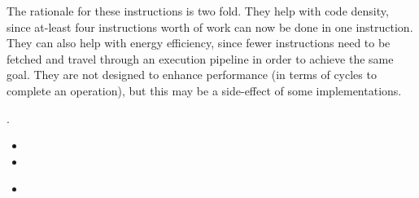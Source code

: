 {The rationale for these instructions is two fold. They help with code density,
since at-least four instructions worth of work can now be done
in one instruction. They can also help with energy efficiency, since fewer
instructions need to be fetched and travel through an execution pipeline in
order to achieve the same goal. They are not designed to enhance performance
(in terms of cycles to complete an operation), but this may be a side-effect
of some implementations.
}
{.\\
\begin{minipage}{0.5\textwidth}
\medskip
\begin{itemize}
\item {}
\item {}
\end{itemize}
\end{minipage}
\begin{minipage}{0.5\textwidth}
\medskip
\begin{itemize}
\item {}
\end{itemize}
\end{minipage}}
